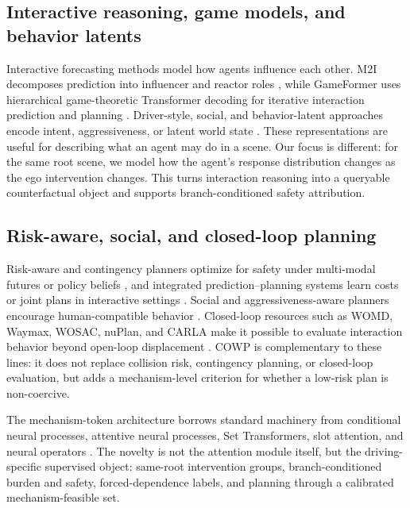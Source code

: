 \documentclass[10pt]{article}
\newcommand{\framework}{COWP}
\begin{document}
\subsection{Interactive reasoning, game models, and behavior latents}
Interactive forecasting methods model how agents influence each other. M2I decomposes prediction into influencer and reactor roles \parencite{sun2022m2i}, while GameFormer uses hierarchical game-theoretic Transformer decoding for iterative interaction prediction and planning \parencite{huang2023gameformer}. Driver-style, social, and behavior-latent approaches encode intent, aggressiveness, or latent world state \parencite{hu2023formulating,chen2025categorical,deng2025social,hao2026styledrive,zheng2025world4drive}. These representations are useful for describing what an agent may do in a scene. Our focus is different: for the same root scene, we model how the agent's response distribution changes as the ego intervention changes. This turns interaction reasoning into a queryable counterfactual object and supports branch-conditioned safety attribution.

\subsection{Risk-aware, social, and closed-loop planning}
Risk-aware and contingency planners optimize for safety under multi-modal futures or policy beliefs \parencite{mustafa2024racp}, and integrated prediction--planning systems learn costs or joint plans in interactive settings \parencite{huang2023differentiable,chen2023interactive}. Social and aggressiveness-aware planners encourage human-compatible behavior \parencite{crosato2024social,hu2023formulating}. Closed-loop resources such as WOMD, Waymax, WOSAC, nuPlan, and CARLA make it possible to evaluate interaction behavior beyond open-loop displacement \parencite{ettinger2021large,gulino2023waymax,montali2023waymo,caesar2021nuplan,dosovitskiy2017carla}. \framework{} is complementary to these lines: it does not replace collision risk, contingency planning, or closed-loop evaluation, but adds a mechanism-level criterion for whether a low-risk plan is non-coercive.

The mechanism-token architecture borrows standard machinery from conditional neural processes, attentive neural processes, Set Transformers, slot attention, and neural operators \parencite{garnelo2018conditional,kim2019attentive,lee2019set,locatello2020object,kovachki2023neural}. The novelty is not the attention module itself, but the driving-specific supervised object: same-root intervention groups, branch-conditioned burden and safety, forced-dependence labels, and planning through a calibrated mechanism-feasible set.
\end{document}
